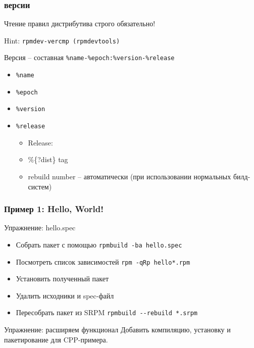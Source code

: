 \begin{frame}
	\frametitle{версии}

	\Large{Чтение правил дистрибутива строго обязательно!}

	Hint: {\tt rpmdev-vercmp (rpmdevtools)}
	\begin{block}{ Версия -- составная}
		{\tt \%name-\%epoch:\%version-\%release}
		\begin{itemize}
			\item {\tt \%name}
			\item {\tt \%epoch}
			\item {\tt \%version}
			\item {\tt \%release}
			\begin{itemize}
				\item Release:
				\item \%\{?dist\} tag
				\item rebuild number -- автоматически (при использовании нормальных билд-систем)
			\end{itemize}
		\end{itemize}
	\end{block}

\end{frame}



\begin{frame}
	\frametitle{Пример 1: Hello, World!}

	\begin{block}{Упражнение: hello.spec}
		\begin{itemize}
			\item Собрать пакет с помощью {\tt rpmbuild -ba hello.spec}
			\item Посмотреть список зависимостей {\tt rpm -qRp hello*.rpm}
			\item Установить полученный пакет
			\item Удалить исходники и spec-файл
			\item Пересобрать пакет из SRPM {\tt rpmbuild -{}-rebuild *.srpm}
		\end{itemize}
	\end{block}

	\pause

	\begin{block}{Упражнение: расширяем функционал}
		Добавить компиляцию, установку и пакетирование для CPP-примера.
	\end{block}

\end{frame}

